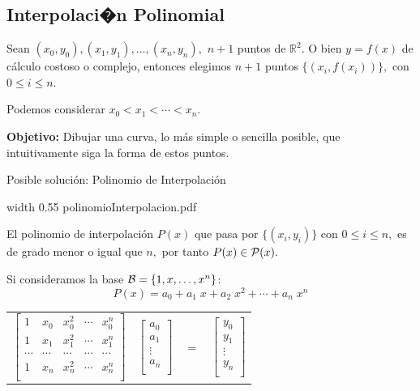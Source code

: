 \documentclass[twoside]{report}
\newcommand{\colocapdf}[2]{\quad\pdfimage width #2 {#1.pdf}}
\begin{document}
\subsection{Interpolaci�n Polinomial}

Sean $(x_0,y_0), (x_1,y_1),\ldots,(x_n,y_n),$ $n+1$ puntos de $\mathbb{R}^2.$ O bien $y=f(x)$ de c\'{a}lculo costoso o complejo, entonces elegimos $n+1$ puntos $\{(x_i,f(x_i))\},$ con $0\leq i\leq n.$

Podemos considerar $x_0<x_1<\cdots <x_n$.

{\bf Objetivo:} Dibujar una curva, lo m\'{a}s simple o sencilla posible, que intuitivamente siga la forma de  estos puntos.

Posible soluci\'{o}n: Polinomio de Interpolaci\'{o}n

%
%
%
%

\begin{center}
\colocapdf{polinomioInterpolacion}{0.55\textwidth}
\end{center}

El polinomio de interpolaci\'{o}n $P(x)$ que pasa por $\{(x_i,y_i)\}$ con $0\leq i \leq n,$ es de grado menor o igual que $n,$ por tanto $P(x)\in {\cal P}(x).$

Si consideramos la base ${\cal B}=\{1,x,\ldots,x^n\}$:
$$P(x)=a_0+a_1 \;x+a_2\; x^2+\cdots+a_n \;x^n$$

\begin{center}
\begin{tabular}{cccc} $\left[ \begin{array}{ccccc}
1&x_0&x_0^2&\cdots&x_0^n\\
1&x_1&x_1^2&\cdots&x_1^n\\
\cdots&\cdots&\cdots&\cdots&\cdots\\
1&x_n&x_n^2&\cdots&x_n^n\\
\end{array} \right]$ & $\left[ \begin{array}{c} a_0\\a_1\\ \vdots \\ a_n \\ \end{array} \right] $& $=$ &
$\left[ \begin{array}{c} y_0\\y_1\\ \vdots \\ y_n \\
\end{array}\right]$
\end{tabular}
\end{center}
\end{document}
